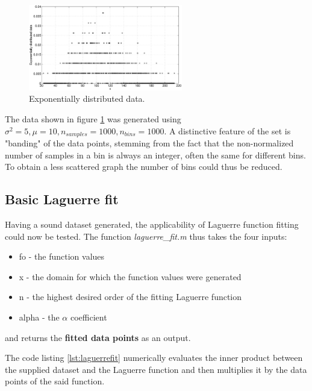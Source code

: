 \documentclass[a4paper]{article}
\numberwithin{equation}{section}
\begin{document}
\begin{figure}[!ht]
\centering
\includegraphics[width=0.6\textwidth]{exp_data.eps}
\caption{\label{fig:expdata}Exponentially distributed data.}
\end{figure}

\noindent The data shown in figure \ref{fig:expdata} was generated using $\sigma^2=5, \mu=10, n_{samples} = 1000, n_{bins} = 1000$. A distinctive feature of the set is "banding" of the data points, stemming from the fact that the non-normalized number of samples in a bin is always an integer, often the same for different bins. To obtain a less scattered graph the number of bins could thus be reduced.

\subsection{Basic Laguerre fit}
Having a sound dataset generated, the applicability of Laguerre function fitting could now be tested. The function \textit{laguerre\_fit.m} thus takes the four inputs:
\begin{itemize}
\item fo - the function values
\item x - the domain for which the function values were generated
\item n - the highest desired order of the fitting Laguerre function
\item alpha - the $\alpha$ coefficient
\end{itemize}
and returns the \textbf{fitted data points} as an output.



\noindent The code listing \ref{lst:laguerrefit} numerically evaluates the inner product between the supplied dataset and the Laguerre function and then multiplies it by the data points of the said function. \\
\end{document}

